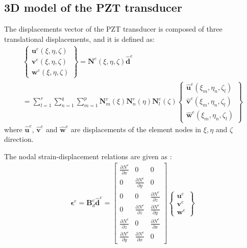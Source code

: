 \documentclass[a4paper,fleqn]{cas-sc}
\begin{document}
\subsection{3D model of the PZT transducer}
\label{sec:3D_SEM}
The displacements vector of the PZT transducer is composed of three translational displacements, and it is defined as:
\begin{eqnarray}
	\left \{ \begin{array}{c}
		\textbf{u}^e(\xi,\eta,\zeta) \\
		\textbf{v}^e(\xi,\eta,\zeta) \\
		\textbf{w}^e(\xi,\eta,\zeta)
	\end{array} \right\}
	= \textbf{N}^e(\xi,\eta, \zeta)\widehat{\textbf{d}}^e\nonumber\\
	= \sum_{l=1}^r\sum_{n=1}^q\sum_{m=1}^p\textbf{N}_m^e(\xi)\textbf{N}_n^e(\eta)\textbf{N}_l^e(\zeta)
	\left \{ \begin{array}{c}
		\widehat{\textbf{u}}^e(\xi_m,\eta_n,\zeta_l) \\
		\widehat{\textbf{v}}^e(\xi_m,\eta_n,\zeta_l) \\
		\widehat{\textbf{w}}^e(\xi_m,\eta_n,\zeta_l)
	\end{array} \right\}
	\label{eq:3D_displ}
\end{eqnarray}
where \(\widehat{\textbf{u}}^e\), \(\widehat{\textbf{v}}^e\) and 
\(\widehat{\textbf{w}}^e\) are displacements of the element nodes in \(\xi,\eta\) and \(\zeta\) direction.

The nodal strain-displacement relations are given as \cite{kudela20093d}:
\begin{eqnarray}
	\boldsymbol{\epsilon}^e=\textbf{B}_{d}^e\widehat{\textbf{d}}^e=
	\left [
	\begin{array}{ccc}
		\frac{\partial N^e}{\partial x} & 0 & 0\\
		0 & \frac{\partial N^e}{\partial y} & 0\\
		0 & 0 & \frac{\partial N^e}{\partial z}\\
		0 & \frac{\partial N^e}{\partial z} & \frac{\partial N^e}{\partial y}\\
		\frac{\partial N^e}{\partial z} & 0 & \frac{\partial N^e}{\partial x}\\
		\frac{\partial N^e}{\partial y} & \frac{\partial N^e}{\partial x} & 0
	\end{array} \right]
	\left \{ \begin{array}{c}
		\textbf{u}^e \\
		\textbf{v}^e \\
		\textbf{w}^e
	\end{array} \right\}
\end{eqnarray}
\end{document}

